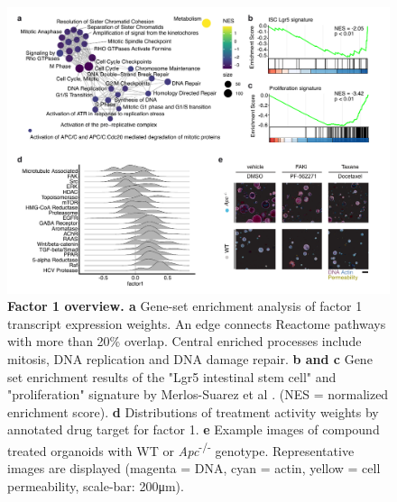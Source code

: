 \begin{flushleft}
\begin{figure}[H]
\centering
\includegraphics[width=\textwidth,
                height=\textheight,
                keepaspectratio]{figures/adenomaprofiling/pdf/fig_2_1.pdf}
\caption[Factor 1 overview]{\textbf{Factor 1 overview. a} Gene-set enrichment analysis of factor 1 transcript expression weights. An edge connects Reactome pathways with more than 20\% overlap. Central enriched processes include mitosis, DNA replication and DNA damage repair. \textbf{b and c} Gene set enrichment results of the "Lgr5 intestinal stem cell" and "proliferation" signature by Merlos-Suarez et al \parencite{merlos-suarezIntestinalStemCell2011}. (NES = normalized enrichment score). \textbf{d} Distributions of treatment activity weights by annotated drug target for factor 1. \textbf{e} Example images of compound treated organoids with WT or \textit{Apc}\textsuperscript{-/-}  genotype. Representative images are displayed (magenta = DNA, cyan = actin, yellow = cell permeability, scale-bar: 200μm).}
\label{fig_190}
\end{figure}
\bigbreak



\end{flushleft}

